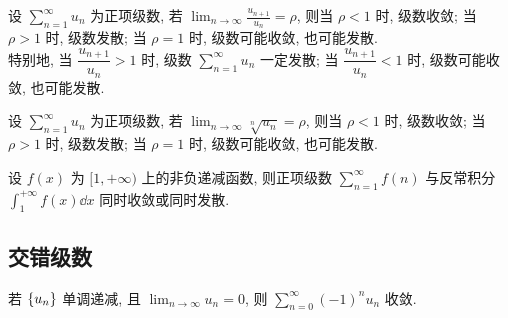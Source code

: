 \begin{theorem}[比值审敛法]
    设 $\displaystyle  \sum_{n=1}^{\infty} u_{n} $ 为正项级数, 若 $\displaystyle  \lim _{n \rightarrow \infty} \frac{u_{n+1}}{u_{n}}=\rho $, 则当 $ \rho<1 $ 时, 级数收敛; 
    当 $ \rho>1 $ 时, 级数发散; 当 $ \rho=1 $ 时, 级数可能收敛, 也可能发散.\\
    特别地, 当 $ \dfrac{u_{n+1}}{u_{n}}>1 $ 时, 级数 $\displaystyle  \sum_{n=1}^{\infty} u_{n} $ 一定发散; 当 $ \dfrac{u_{n+1}}{u_{n}}<1 $ 时, 级数可能收敛, 也可能发散.
\end{theorem}

\begin{theorem}[根值审敛法]
    设 $\displaystyle \sum_{n=1}^{\infty} u_{n} $ 为正项级数, 若 $\displaystyle \lim _{n \rightarrow \infty} \sqrt[n]{u_{n}}=\rho $, 则当 $ \rho<1 $ 时, 级数收敛; 
    当 $ \rho>1 $ 时, 级数发散; 当 $ \rho=1 $ 时, 级数可能收敛, 也可能发散.
\end{theorem}

\begin{theorem}[积分判别法]
    设 $ f(x) $ 为 $ [1,+\infty) $ 上的非负递减函数, 则正项级数 $\displaystyle  \sum_{n=1}^{\infty} f(n) $ 与反常积分 $\displaystyle \int_{1}^{+\infty} f(x) \dd x $ 同时收敛或同时发散.
\end{theorem}

\subsection{交错级数}

\begin{theorem}[Leibniz 定理]
    若 $\qty{u_n}$ 单调递减, 且 $\displaystyle\lim_{n\to\infty}u_n=0$, 则 $\displaystyle\sum_{n=0}^{\infty}(-1)^nu_n$ 收敛.
\end{theorem}

